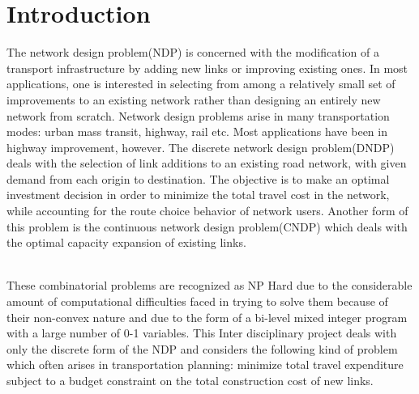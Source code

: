 \documentclass{article}
\begin{document}
\section{Introduction}
The network design problem(NDP) is concerned with the modification of a transport infrastructure by adding new links or improving existing ones. In most applications, one is interested in selecting from among a relatively small set of improvements to an existing network rather than designing an entirely new network from scratch. Network design problems arise in many transportation modes: urban mass transit, highway, rail etc. Most applications have been in highway improvement, however. The discrete network design problem(DNDP) deals with the selection of link additions to an existing road network, with given demand from each origin to destination. The objective is to make an optimal investment decision in order to minimize the total travel cost in the network, while accounting for the route choice behavior of network users. Another form of this problem is the continuous network design problem(CNDP) which deals with the optimal capacity expansion of existing links.\par
\noindent
\\These combinatorial problems are recognized as NP Hard due to the considerable amount of computational difficulties faced in trying to solve them because of their non-convex nature and due to the form of a bi-level mixed integer program with a large number of 0-1 variables. This Inter disciplinary project deals with only the discrete form of the NDP and considers the following kind of problem which often arises in transportation planning: minimize total travel expenditure subject to a budget constraint on the total construction cost of new links.
 
\end{document}
